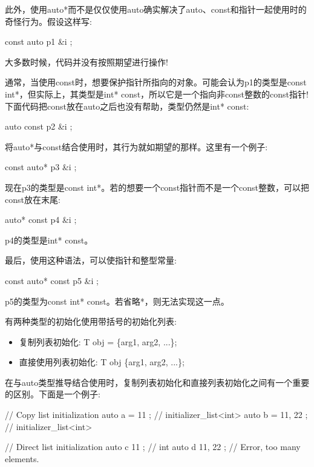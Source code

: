 此外，使用auto*而不是仅仅使用auto确实解决了auto、const和指针一起使用时的奇怪行为。假设这样写:

\begin{cpp}
const auto p1 { &i };
\end{cpp}

大多数时候，代码并没有按照期望进行操作!

通常，当使用const时，想要保护指针所指向的对象。可能会认为p1的类型是const int*，但实际上，其类型是int* const，所以它是一个指向非const整数的const指针!下面代码把const放在auto之后也没有帮助，类型仍然是int* const:

\begin{cpp}
auto const p2 { &i };
\end{cpp}

将auto*与const结合使用时，其行为就如期望的那样。这里有一个例子:

\begin{cpp}
const auto* p3 { &i };
\end{cpp}

现在p3的类型是const int*。若的想要一个const指针而不是一个const整数，可以把const放在末尾:

\begin{cpp}
auto* const p4 { &i };
\end{cpp}

p4的类型是int* const。

最后，使用这种语法，可以使指针和整型常量:

\begin{cpp}
const auto* const p5 { &i };
\end{cpp}

p5的类型为const int* const。若省略*，则无法实现这一点。


有两种类型的初始化使用带括号的初始化列表:

\begin{itemize}
\item
复制列表初始化: T obj = \{arg1, arg2, ...\};

\item
直接使用列表初始化: T obj \{arg1, arg2, ...\};
\end{itemize}

在与auto类型推导结合使用时，复制列表初始化和直接列表初始化之间有一个重要的区别。下面是一个例子:

\begin{cpp}
// Copy list initialization
auto a = { 11 }; // initializer_list<int>
auto b = { 11, 22 }; // initializer_list<int>

// Direct list initialization
auto c { 11 }; // int
auto d { 11, 22 }; // Error, too many elements.
\end{cpp}

